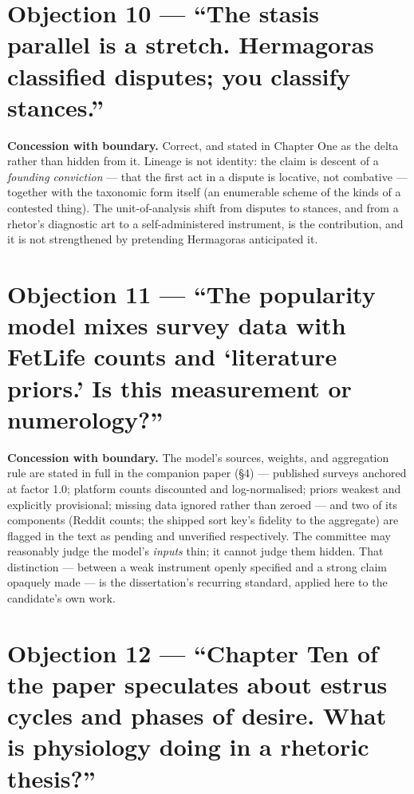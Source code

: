 \section{Objection 10 --- ``The stasis parallel is a stretch. Hermagoras
classified disputes; you classify
stances.''}\label{objection-10-the-stasis-parallel-is-a-stretch.-hermagoras-classified-disputes-you-classify-stances.}

\textbf{Concession with boundary.} Correct, and stated in Chapter One as
the delta rather than hidden from it. Lineage is not identity: the claim
is descent of a \emph{founding conviction} --- that the first act in a
dispute is locative, not combative --- together with the taxonomic form
itself (an enumerable scheme of the kinds of a contested thing). The
unit-of-analysis shift from disputes to stances, and from a rhetor's
diagnostic art to a self-administered instrument, is the contribution,
and it is not strengthened by pretending Hermagoras anticipated it.

\section{Objection 11 --- ``The popularity model mixes survey data with
FetLife counts and `literature priors.' Is this measurement or
numerology?''}\label{objection-11-the-popularity-model-mixes-survey-data-with-fetlife-counts-and-literature-priors.-is-this-measurement-or-numerology}

\textbf{Concession with boundary.} The model's sources, weights, and
aggregation rule are stated in full in the companion paper (\S 4) ---
published surveys anchored at factor 1.0; platform counts discounted and
log-normalised; priors weakest and explicitly provisional; missing data
ignored rather than zeroed --- and two of its components (Reddit counts;
the shipped sort key's fidelity to the aggregate) are flagged in the
text as pending and unverified respectively. The committee may
reasonably judge the model's \emph{inputs} thin; it cannot judge them
hidden. That distinction --- between a weak instrument openly specified
and a strong claim opaquely made --- is the dissertation's recurring
standard, applied here to the candidate's own work.

\section{Objection 12 --- ``Chapter Ten of the paper speculates about
estrus cycles and phases of desire. What is physiology doing in a
rhetoric
thesis?''}\label{objection-12-chapter-ten-of-the-paper-speculates-about-estrus-cycles-and-phases-of-desire.-what-is-physiology-doing-in-a-rhetoric-thesis}

